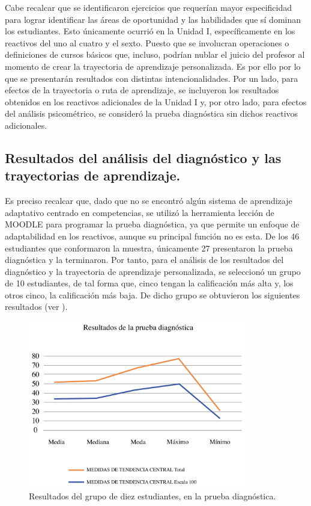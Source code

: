 \documentclass[spanish]{textolivre}
\begin{document}
Cabe recalcar que se identificaron ejercicios que requerían mayor especificidad para lograr identificar las áreas de oportunidad y las habilidades que sí dominan los estudiantes. Esto únicamente ocurrió en la Unidad I, específicamente en los reactivos del uno al cuatro y el sexto. Puesto que se involucran operaciones o definiciones de cursos básicos que, incluso, podrían nublar el juicio del profesor al momento de crear la trayectoria de aprendizaje personalizada. Es por ello por lo que se presentarán resultados con distintas intencionalidades. Por un lado, para efectos de la trayectoria o ruta de aprendizaje, se incluyeron los resultados obtenidos en los reactivos adicionales de la Unidad I y, por otro lado, para efectos del análisis psicométrico, se consideró la prueba diagnóstica sin dichos reactivos adicionales.

\subsection{Resultados del análisis del diagnóstico y las trayectorias de aprendizaje.}\label{sec-organizacao-latex}

Es preciso recalcar que, dado que no se encontró algún sistema de aprendizaje adaptativo centrado en competencias, se utilizó la herramienta lección de MOODLE para programar la prueba diagnóstica, ya que permite un enfoque de adaptabilidad en los reactivos, aunque su principal función no es esta. De los 46 estudiantes que conformaron la muestra, únicamente 27 presentaron la prueba diagnóstica y la terminaron. Por tanto, para el análisis de los resultados del diagnóstico y la trayectoria de aprendizaje personalizada, se seleccionó un grupo de 10 estudiantes, de tal forma que, cinco tengan la calificación más alta y, los otros cinco, la calificación más baja. De dicho grupo se obtuvieron los siguientes resultados (ver ).

\begin{figure}[h!]
   \centering
   \includegraphics[width=0.85\textwidth]{fig-03.pdf}
   \caption{Resultados del grupo de diez estudiantes, en la prueba diagnóstica.}
   \label{fig:03}
\end{figure}
\end{document}
